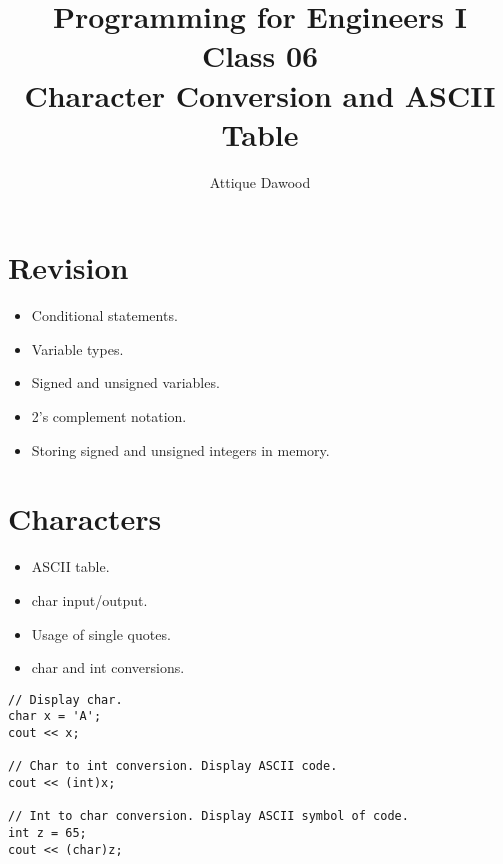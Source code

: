\documentclass[12pt,a4paper]{article}
\title{\vspace{-2cm}Programming for Engineers I\\Class 06\\Character Conversion and ASCII Table}
\author{Attique Dawood}
\begin{document}
\maketitle
\section{Revision}
\begin{itemize}
\item Conditional statements.
\item Variable types.
\item Signed and unsigned variables.
\item 2's complement notation.
\item Storing signed and unsigned integers in memory.
\end{itemize}
\section{Characters}
\begin{itemize}
\item ASCII table.
\item char input/output.
\item Usage of single quotes.
\item char and int conversions.
\end{itemize}
\begin{lstlisting}
// Display char.
char x = 'A';
cout << x;

// Char to int conversion. Display ASCII code.
cout << (int)x;

// Int to char conversion. Display ASCII symbol of code.
int z = 65;
cout << (char)z;
\end{lstlisting}
\end{document}
